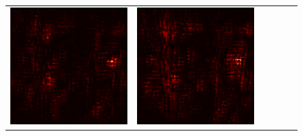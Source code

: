 \documentclass[preprint,12pt]{elsarticle}
\begin{document}
\begin{figure}[p]
\begin{tabular}{cccccc}
  \includegraphics[scale=\scale]{../visualizations/examples/imagenette/cnn/positive_saliency_map/9.png} & 
  \includegraphics[scale=\scale]{../visualizations/examples/imagenette/cnn/negative_saliency_map/9.png} & 

\end{tabular}
\end{figure}
\end{document}
